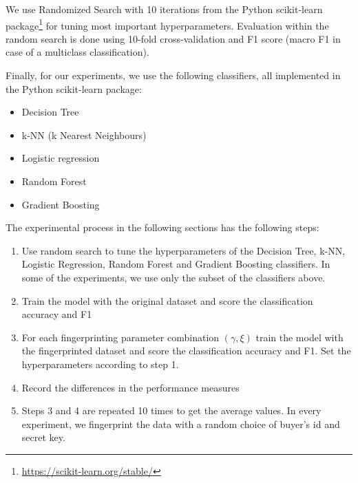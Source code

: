 We use Randomized Search with 10 iterations from the Python scikit-learn package\footnote{\url{https://scikit-learn.org/stable/}} for tuning most important hyperparameters. 
Evaluation within the random search is done using 10-fold cross-validation and F1 score (macro F1 in case of a multiclass classification). 

Finally, for our experiments, we use the following classifiers, all implemented in the Python scikit-learn package:
\begin{itemize}
    \item Decision Tree
    \item k-NN (k Nearest Neighbours)
    \item Logistic regression
    \item Random Forest
    \item Gradient Boosting
\end{itemize}

The experimental process in the following sections has the following steps:
\begin{enumerate}
    \item Use random search to tune the hyperparameters of the Decision Tree, k-NN, Logistic Regression, Random Forest and Gradient Boosting classifiers. In some of the experiments, we use only the subset of the classifiers above. 
    \item Train the model with the original dataset and score the classification accuracy and F1
    \item For each fingerprinting parameter combination $(\gamma, \xi)$ train the model with the fingerprinted dataset and score the classification accuracy and F1. Set the hyperparameters according to step 1.  
    \item Record the differences in the performance measures
    \item Steps 3 and 4 are repeated 10 times to get the average values. In every experiment, we fingerprint the data with a random choice of buyer's id and secret key.
    
\end{enumerate}









